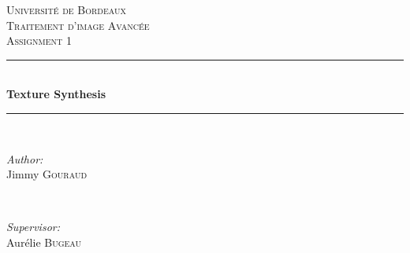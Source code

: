 \begin{titlepage}

\newcommand{\HRule}{\rule{\linewidth}{0.5mm}} %

\center %
 

\textsc{\LARGE Université de Bordeaux}\\[1.5cm] %
\textsc{\Large Traitement d'image Avancée}\\[0.5cm] %
\textsc{\large Assignment 1}\\[0.5cm] %


\HRule \\[0.4cm]
{ \huge \bfseries Texture Synthesis}\\[0.4cm] %
\HRule \\[1.5cm]
 

\begin{minipage}{0.4\textwidth}
\begin{flushleft} \large
\emph{Author:}\\
Jimmy \textsc{Gouraud} %
\end{flushleft}
\end{minipage}
~
\begin{minipage}{0.4\textwidth}
\begin{flushright} \large
\emph{Supervisor:} \\
Aurélie \textsc{Bugeau} %
\end{flushright}
\end{minipage}\\[2cm]



\end{titlepage}

